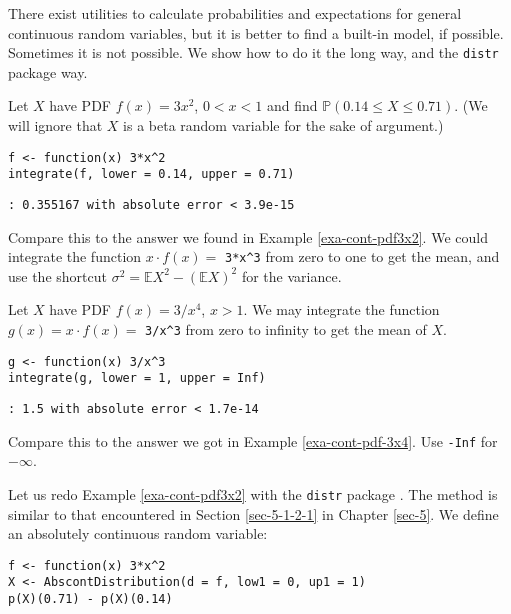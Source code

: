 There exist utilities to calculate probabilities and expectations for
general continuous random variables, but it is better to find a
built-in model, if possible. Sometimes it is not possible. We show how
to do it the long way, and the \texttt{distr}  package \cite{distr} way.


Let \(X\) have PDF \(f(x)=3x^{2}\), \(0<x<1\) and find
\(\mathbb{P}(0.14\leq X\leq0.71)\). (We will ignore that \(X\) is a
beta random variable for the sake of argument.)

\begin{verbatim}
f <- function(x) 3*x^2
integrate(f, lower = 0.14, upper = 0.71)
\end{verbatim}

\begin{verbatim}
: 0.355167 with absolute error < 3.9e-15
\end{verbatim}

Compare this to the answer we found in Example \ref{exa-cont-pdf3x2}. We could
integrate the function \(x \cdot f(x)=\) \texttt{3*x\textasciicircum{}3} from zero to one to
get the mean, and use the shortcut \(\sigma^{2}=\mathbb{E}
X^{2}-\left(\mathbb{E} X\right)^{2}\) for the variance.




Let \(X\) have PDF \(f(x)=3/x^{4}\), \(x>1\). We may integrate the
function \(g(x) = x \cdot f(x)=\) \texttt{3/x\textasciicircum{}3} from zero to infinity to get
the mean of \(X\).

\begin{verbatim}
g <- function(x) 3/x^3
integrate(g, lower = 1, upper = Inf)
\end{verbatim}

\begin{verbatim}
: 1.5 with absolute error < 1.7e-14
\end{verbatim}

Compare this to the answer we got in Example \ref{exa-cont-pdf-3x4}. Use \texttt{-Inf}
for \(-\infty\).




Let us redo Example \ref{exa-cont-pdf3x2} with the \texttt{distr} package
\cite{distr}. The method is similar to that encountered in Section
\ref{sec-5-1-2-1} in Chapter \ref{sec-5}. We define an
absolutely continuous random variable:

\begin{verbatim}
f <- function(x) 3*x^2
X <- AbscontDistribution(d = f, low1 = 0, up1 = 1)
p(X)(0.71) - p(X)(0.14)
\end{verbatim}

